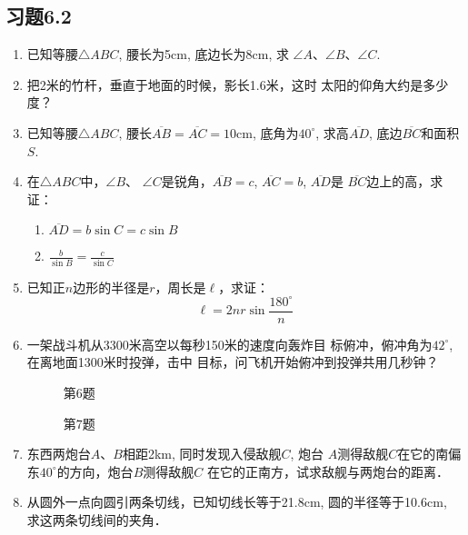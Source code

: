 \subsection*{习题6.2}
\begin{enumerate}
    \item 已知等腰$\triangle ABC$, 腰长为5cm, 底边长为8cm, 求
    $\angle A$、$\angle B$、$\angle C$.
    \item 把2米的竹杆，垂直于地面的时候，影长1.6米，这时
    太阳的仰角大约是多少度？
    \item  已知等腰$\triangle ABC$, 腰长$\overline{AB}=\overline{AC}=10$cm, 底角为$40^{\circ}$, 
    求高$\overline{AD}$, 底边$\overline{BC}$和面积$S$.
    \item 在$\triangle ABC$中，$\angle B$、
    $\angle C$是锐角，$\overline{AB}=c$, $\overline{AC}=b$, $\overline{AD}$是
    $\overline{BC}$边上的高，求证：
\begin{enumerate}
    \item $\overline{AD}=b\sin C=c\sin B$
    \item $\frac{b}{\sin B}=\frac{c}{\sin C}$
\end{enumerate}
\item 已知正$n$边形的半径是$r$，周长是$\ell$，求证：
\[\ell=2nr\sin\frac{180^{\circ}}{n}\]
\item  一架战斗机从3300米高空以每秒150米的速度向轰炸目
标俯冲，俯冲角为$42^{\circ}$, 在离地面1300米时投弹，击中
目标，问飞机开始俯冲到投弹共用几秒钟？
\begin{figure}[htp]\centering
    \begin{minipage}[t]{0.48\textwidth}
    \centering
{}
    \caption*{第6题}
    \end{minipage}
    \begin{minipage}[t]{0.48\textwidth}
    \centering
    \caption*{第7题}
    \end{minipage}
    \end{figure}

\item 东西两炮台$A$、$B$相距2km, 同时发现入侵敌舰$C$, 炮台
$A$测得敌舰$C$在它的南偏东$40^{\circ}$的方向，炮台$B$测得敌舰$C$
在它的正南方，试求敌舰与两炮台的距离．

\item 
从圆外一点向圆引两条切线，已知切线长等于21.8cm, 
圆的半径等于10.6cm, 求这两条切线间的夹角．
\end{enumerate}


